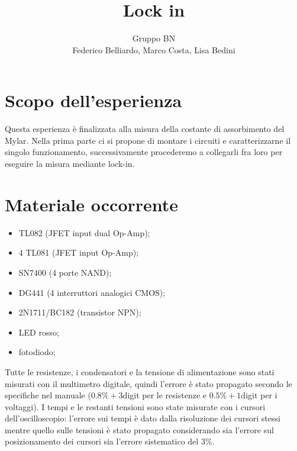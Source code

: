 \documentclass[10pt,a4paper]{article}
\author{Gruppo BN \\ Federico Belliardo, Marco Costa, Lisa Bedini}
\title{Lock in}
\begin{document}
\maketitle
\section{Scopo dell'esperienza}
Questa esperienza è finalizzata alla misura della costante di assorbimento del Mylar. Nella prima parte ci si propone di montare i circuiti e caratterizzarne il singolo funzionamento, successivamente procederemo a collegarli fra loro per eseguire la misura mediante lock-in.


\section{Materiale occorrente}
\begin{itemize}
\item TL082 (JFET input dual Op-Amp);
\item 4 TL081 (JFET input Op-Amp);
\item SN7400 (4 porte NAND);
\item DG441 (4 interruttori analogici CMOS);
\item 2N1711/BC182 (transistor NPN);
\item LED rosso;
\item fotodiodo;
\end{itemize}


Tutte le resistenze, i condensatori e la tensione di alimentazione sono stati misurati con il multimetro digitale, quindi l'errore è stato propagato secondo le specifiche nel manuale ($0.8\% + 3$digit per le resistenze e $0.5\% + 1$digit per i voltaggi). I tempi e le restanti tensioni sono state misurate con i cursori dell'oscilloscopio: l'errore sui tempi è dato dalla risoluzione dei cursori stessi mentre quello sulle tensioni è stato propagato considerando sia l'errore sul posizionamento dei cursori sia l'errore sistematico del $3\%$.
\end{document}
